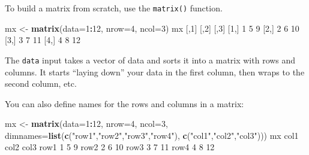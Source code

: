 \documentclass[
]{book}
\newenvironment{Shaded}{\begin{snugshade}}{\end{snugshade}}
\newcommand{\DataTypeTok}[1]{\textcolor[rgb]{0.13,0.29,0.53}{#1}}
\newcommand{\DecValTok}[1]{\textcolor[rgb]{0.00,0.00,0.81}{#1}}
\newcommand{\KeywordTok}[1]{\textcolor[rgb]{0.13,0.29,0.53}{\textbf{#1}}}
\newcommand{\NormalTok}[1]{#1}
\newcommand{\OperatorTok}[1]{\textcolor[rgb]{0.81,0.36,0.00}{\textbf{#1}}}
\newcommand{\StringTok}[1]{\textcolor[rgb]{0.31,0.60,0.02}{#1}}
\begin{document}
To build a matrix from scratch, use the \texttt{matrix()} function.

\begin{Shaded}
\begin{Highlighting}[]
\NormalTok{mx <-}\StringTok{ }\KeywordTok{matrix}\NormalTok{(}\DataTypeTok{data=}\DecValTok{1}\OperatorTok{:}\DecValTok{12}\NormalTok{, }
             \DataTypeTok{nrow=}\DecValTok{4}\NormalTok{,}
             \DataTypeTok{ncol=}\DecValTok{3}\NormalTok{)}
\NormalTok{mx}
\NormalTok{     [,}\DecValTok{1}\NormalTok{] [,}\DecValTok{2}\NormalTok{] [,}\DecValTok{3}\NormalTok{]}
\NormalTok{[}\DecValTok{1}\NormalTok{,]    }\DecValTok{1}    \DecValTok{5}    \DecValTok{9}
\NormalTok{[}\DecValTok{2}\NormalTok{,]    }\DecValTok{2}    \DecValTok{6}   \DecValTok{10}
\NormalTok{[}\DecValTok{3}\NormalTok{,]    }\DecValTok{3}    \DecValTok{7}   \DecValTok{11}
\NormalTok{[}\DecValTok{4}\NormalTok{,]    }\DecValTok{4}    \DecValTok{8}   \DecValTok{12}
\end{Highlighting}
\end{Shaded}

The \texttt{data} input takes a vector of data and sorts it into a matrix with rows and columns. It starts ``laying down'' your data in the first column, then wraps to the second column, etc.

You can also define names for the rows and columns in a matrix:

\begin{Shaded}
\begin{Highlighting}[]
\NormalTok{mx <-}\StringTok{ }\KeywordTok{matrix}\NormalTok{(}\DataTypeTok{data=}\DecValTok{1}\OperatorTok{:}\DecValTok{12}\NormalTok{, }
             \DataTypeTok{nrow=}\DecValTok{4}\NormalTok{,}
             \DataTypeTok{ncol=}\DecValTok{3}\NormalTok{,}
             \DataTypeTok{dimnames=}\KeywordTok{list}\NormalTok{(}\KeywordTok{c}\NormalTok{(}\StringTok{"row1"}\NormalTok{,}\StringTok{"row2"}\NormalTok{,}\StringTok{"row3"}\NormalTok{,}\StringTok{"row4"}\NormalTok{),}
                           \KeywordTok{c}\NormalTok{(}\StringTok{"col1"}\NormalTok{,}\StringTok{"col2"}\NormalTok{,}\StringTok{"col3"}\NormalTok{)))}
\NormalTok{mx}
\NormalTok{     col1 col2 col3}
\NormalTok{row1    }\DecValTok{1}    \DecValTok{5}    \DecValTok{9}
\NormalTok{row2    }\DecValTok{2}    \DecValTok{6}   \DecValTok{10}
\NormalTok{row3    }\DecValTok{3}    \DecValTok{7}   \DecValTok{11}
\NormalTok{row4    }\DecValTok{4}    \DecValTok{8}   \DecValTok{12}
\end{Highlighting}
\end{Shaded}
\end{document}
